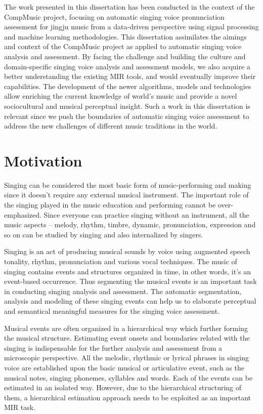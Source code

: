 The work presented in this dissertation has been conducted in the context of the CompMusic project, focusing on automatic singing voice pronunciation assessment for jingju music from a data-driven perspective using signal processing and machine learning methodologies. This dissertation assimilates the aimings and context of the CompMusic project as applied to automatic singing voice analysis and assessment.  By facing the challenge and building the culture and domain-specific singing voice analysis and assessment models, we also acquire a better understanding the existing \gls{MIR} tools, and would eventually improve their capabilities. The development of the newer algorithms, models and technologies allow enriching the current knowledge of world's music and provide a novel sociocultural and musical perceptual insight. Such a work in this dissertation is relevant since we push the boundaries of automatic singing voice assessment to address the new challenges of different music traditions in the world. 

\section{Motivation}
Singing can be considered the most basic form of music-performing and making since it doesn't require any external musical instrument. The important role of the singing played in the music education and performing cannot be over-emphasized. Since everyone can practice singing without an instrument, all the music aspects -- melody, rhythm, timbre, dynamic, pronunciation, expression and so on can be studied by singing and also internalized by singers.

Singing is an act of producing musical sounds by voice using augmented speech tonality, rhythm, pronunciation and various vocal techniques. The music of singing contains events and structures organized in time, in other words, it's an event-based occurrence. Thus segmenting the musical events is an important task in conducting singing analysis and assessment. The automatic segmentation, analysis and modeling of these singing events can help us to elaborate perceptual and semantical meaningful measures for the singing voice assessment.

Musical events are often organized in a hierarchical way which further forming the musical structure. Estimating event onsets and boundaries related with the singing is indispensable for the further analysis and assessment from a microscopic perspective. All the melodic, rhythmic or lyrical phrases in singing voice are established upon the basic musical or articulative event, such as the musical notes, singing phonemes, syllables and words. Each of the events can be estimated in an isolated way. However, due to the hierarchical structuring of them, a hierarchical estimation approach needs to be exploited as an important \gls{MIR} task.

